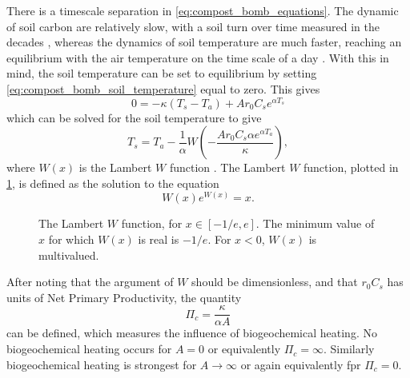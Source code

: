 There is a timescale separation in \cref{eq:compost_bomb_equations}. The dynamic of soil carbon are relatively slow, with a soil turn over time measured in the decades \parencite{Varney2022},
whereas the dynamics of soil temperature are much faster, reaching an equilibrium with the air temperature on the time scale of a day \parencite{Best2005}. With this in mind, the soil
temperature can be set to equilibrium by setting \cref{eq:compost_bomb_soil_temperature} equal to zero. This gives
\begin{equation*}
  0 = - \kappa \left(T_s - T_a\right) + Ar_0C_se^{\alpha T_s}
\end{equation*}
which can be solved for the soil temperature to  give
\begin{equation}
  \label{eq:soil_temperature_equilibrium}
  T_s = T_a - \frac{1}{\alpha} W\left(-\frac{Ar_0C_s \alpha e^{\alpha T_a}}{\kappa} \right),
\end{equation}
where $W(x)$ is the Lambert $W$ function \parencite{Corless1996}. The Lambert $W$ function, plotted in \cref{fig:lambert_W}, is defined as the solution to the equation
\begin{equation}
  \label{eq:lambert_W}
  W(x)e^{W(x)} = x.
\end{equation}

\begin{figure}
  \centering
  \caption[The Lambert $W$ function]{The Lambert $W$ function, for $x \in [-1/e,e]$. The minimum value of $x$ for which $W(x)$ is real is $-1/e$. For $x < 0$, $W(x)$ is
  multivalued.}
  \label{fig:lambert_W}
\end{figure}

After noting that the argument of $W$ should be dimensionless, and that $r_0C_s$ has units of Net Primary Productivity, the quantity 
\begin{equation}
  \label{eq:critical_npp}
  \Pi_c = \frac{\kappa}{\alpha A}
\end{equation}
can be defined, which measures the influence of biogeochemical heating. No biogeochemical heating occurs for $A = 0$ or equivalently $\Pi_c = \infty$. Similarly
biogeochemical heating is strongest for $A \rightarrow \infty$ or again equivalently fpr $\Pi_c = 0$.

